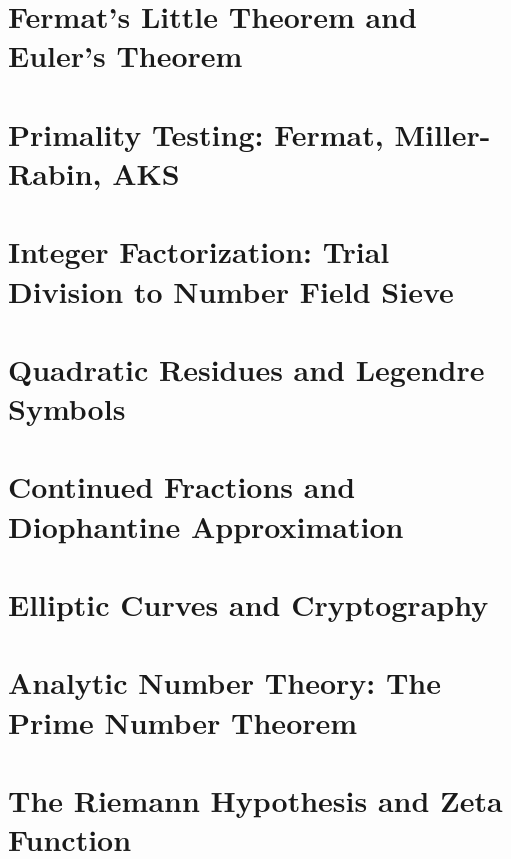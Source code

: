\chapter{Fermat's Little Theorem and Euler's Theorem}
\chapter{Primality Testing: Fermat, Miller-Rabin, AKS}
\chapter{Integer Factorization: Trial Division to Number Field Sieve}
\chapter{Quadratic Residues and Legendre Symbols}
\chapter{Continued Fractions and Diophantine Approximation}
\chapter{Elliptic Curves and Cryptography}
\chapter{Analytic Number Theory: The Prime Number Theorem}
\chapter{The Riemann Hypothesis and Zeta Function}